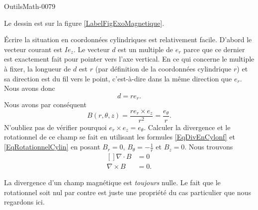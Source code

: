 
\begin{corrige}{OutilsMath-0079}

    Le dessin est sur la figure \ref{LabelFigExoMagnetique}.
    \newcommand{\CaptionFigExoMagnetique}{La façon naturelle de décrire la situation sont les coordonnées cylindriques.}
    

    Écrire la situation en coordonnées cylindriques est relativement facile. D'abord le vecteur courant est $Ie_z$. Le vecteur $d$ est un multiple de $e_r$ parce que ce dernier est exactement fait pour pointer vers l'axe vertical. En ce qui concerne le multiple à fixer, la longueur de $d$ est $r$ (par définition de la coordonnées cylindrique $r$) et sa direction est du fil vers le point, c'est-à-dire dans la même direction que $e_r$. Nous avons donc
    \begin{equation}
        d=re_r.
    \end{equation}
    Nous avons par conséquent
    \begin{equation}
        B(r,\theta,z)=\frac{ re_r\times e_z }{ r^2 }=\frac{ e_{\theta} }{ r }.
    \end{equation}
    N'oubliez pas de vérifier pourquoi $e_r\times e_z=e_{\theta}$. Calculer la divergence et le rotationnel de ce champ se fait en utilisant les formules \eqref{EqDivEnCylonf} et \eqref{EqRotationnelCylin} en posant $B_r=0$, $B_{\theta}=-\frac{1}{ r }$ et $B_z=0$. Nous trouvons
    \begin{equation}
        \begin{aligned}[]
            \nabla\cdot B&=0\\
            \nabla\times B&=0.
        \end{aligned}
    \end{equation}
    
    \begin{remark}
        La divergence d'un champ magnétique est \emph{toujours} nulle. Le fait que le rotationnel soit nul par contre est juste une propriété du cas particulier que nous regardons ici.
    \end{remark}

\end{corrige}
